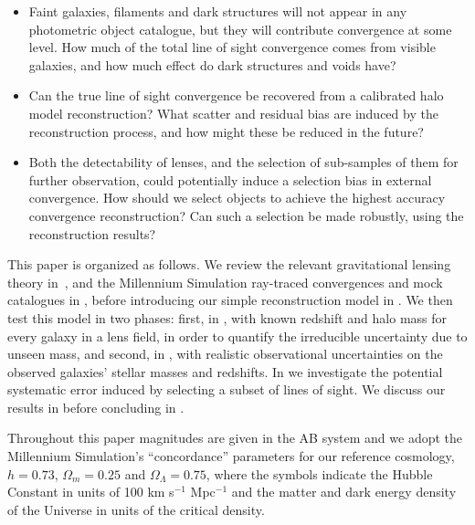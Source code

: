 \documentclass[useAMS,usenatbib,a4paper]{mn2e}
\begin{document}
\begin{itemize}

\item Faint galaxies, filaments and dark structures will not appear in
any photometric object catalogue, but they will contribute convergence at
some level. How much of the total line of sight 
convergence comes from visible
galaxies, and how much effect do dark structures and voids have? 

\item Can the true line of sight convergence be recovered from a calibrated
halo model reconstruction? What scatter and residual bias are induced by the
reconstruction process, and how might these be reduced in the future? 

\item Both the detectability of lenses, and the selection of sub-samples of
them for further observation, could potentially induce a selection bias in
external convergence. How should we select objects to achieve the highest
accuracy convergence reconstruction? Can such a selection be made robustly,
using the reconstruction results?

\end{itemize}


This paper is organized as follows. We review the relevant gravitational
lensing theory in~, and the Millennium Simulation
ray-traced convergences and mock catalogues in , before
introducing our simple reconstruction  model in . We
then test this model in two phases: first, in , with
known redshift and halo mass for every galaxy in a lens field, in order
to quantify the irreducible uncertainty due to unseen mass, and second,
in , with realistic observational uncertainties on
the observed galaxies' stellar masses and redshifts. In
 we investigate the potential systematic error induced
by selecting a subset of lines of sight. We discuss our results in
 before concluding in .

Throughout this paper magnitudes are given in the AB system and
we adopt the Millennium Simulation's ``concordance'' parameters for our reference cosmology, \ie
$h=0.73$, $\Omega_m=0.25$ and $\Omega_\Lambda=0.75$, where the symbols indicate
the Hubble Constant in units of 100 km s$^{-1}$ Mpc$^{-1}$ and the matter and
dark energy density of the Universe in units of the critical density.
\end{document}
